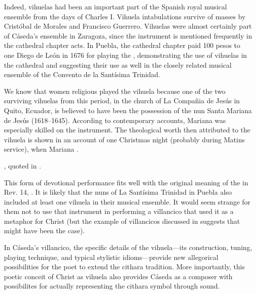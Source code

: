 Indeed, vihuelas had been an important part of the Spanish royal musical ensemble
from the days of Charles I.
Vihuela intabulations survive of masses by Cristóbal de Morales and Francisco
Guerrero.%
    \Autocite{Grove:Vihuela}
Vihuelas were almost certainly part of Cáseda's ensemble in Zaragoza, since the
instrument is mentioned frequently in the cathedral chapter acts.%
    \Autocite{Calahorra:Zaragoza2}
In Puebla, the cathedral chapter paid 100 pesos to one Diego de León in 1676
for playing the , demonstrating the use of vihuelas in
the cathedral and suggesting their use as well in the closely related musical
ensemble of the Convento de la Santísima Trinidad.%
    \Autocite[44]{PerezRuiz:Aportes}


We know that women religious played the vihuela because one of the two
surviving vihuelas from this period, in the church of La Compañia de Jesús in
Quito, Ecuador, is believed to have been the possession of the nun Santa
Mariana de Jesús (1618--1645).
According to contemporary accounts, Mariana was especially skilled on the
instrument. 
The theological worth then attributed to the vihuela is shown in an account of
one Christmas night (probably during Matins service), when Mariana .%
\begin{Footnote}
    \Autocite[275]{EspinosaPolit:SantaMariana}, quoted in
    \Autocite[73]{Bermudez:Vihuela}.
\end{Footnote}
This form of devotional performance fits well with the original meaning of the
 in Rev. 14, .%
    \Autocite{BDAG}
It is likely that the nuns of La Santísima Trinidad in Puebla also included at
least one vihuela in their musical ensemble.
It would seem strange for them not to use that instrument in performing a
villancico that used it as a metaphor for Christ (but the example of
 villancicos discussed in  suggests that might
have been the case).


In Cáseda's villancico, the specific details of the vihuela---its construction,
tuning, playing technique, and typical stylistic idioms---provide new
allegorical possibilities for the poet to extend the cithara tradition.
More importantly, this poetic conceit of Christ as vihuela also provides Cáseda
as a composer with possibilites for actually representing the cithara symbol
through sound.

